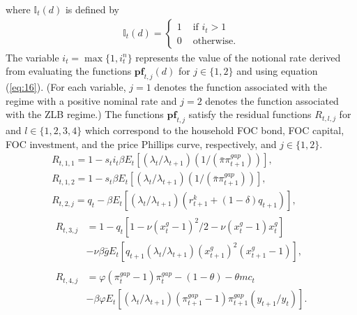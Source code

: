 \documentclass[12pt, final]{article}
\begin{document}
where $\mathds{I}_t(d)$ is defined by
\begin{gather}
    \label{eq:19}
  \mathds{I}_t(d) = 
\begin{cases}
     1 &\text{ if } i_t > 1\\
     0 &\text{ otherwise.}
\end{cases}
\end{gather}
The variable $i_t=\max\{1,i_t^n\}$ represents the value of the notional rate derived from evaluating the functions $\textbf{pf}_{t,j}(d)$ for $j \in \{1,2\}$ and using equation (\ref{eq:16}). (For each variable, $j=1$ denotes the function associated with the regime with a positive nominal rate and $j=2$ denotes the function associated with the ZLB regime.) %
The functions $\textbf{pf}_{t,j}$ satisfy the residual functions $R_{t,l,j}$ for and $l \in \{1,2,3,4\}$ which correspond to the household FOC bond, FOC capital, FOC investment, and the price Phillips curve, respectively, and $j \in \{1,2\}$.
\begin{gather}
\label{eq:20}
  R_{t,1,1} = 1 - s_ti_t\beta E_t[(\lambda_t/\lambda_{t+1})(1/(\bar{\pi}\pi_{t+1}^{gap}))],\\
\label{eq:21}
  R_{t,1,2} = 1 - s_t\beta E_t[(\lambda_t/\lambda_{t+1})(1/(\bar{\pi}\pi_{t+1}^{gap}))],\\
\label{eq:22}
R_{t,2,j} = q_t - \beta E_t[(\lambda_t/\lambda_{t+1})(r^k_{t+1}+(1-\delta)q_{t+1})],\\
 \label{eq:23} 
  \begin{split}
    R_{t,3,j} &= 1 - q_t[1-\nu(x^g_t-1)^2/2 - \nu(x_t^g-1)x_t^g] \\&- \nu\beta\bar{g}E_t[q_{t+1}(\lambda_t/\lambda_{t+1})(x^g_{t+1})^2(x^g_{t+1}-1)], 
  \end{split}
  \\
   \label{eq:24}
  \begin{split}
    R_{t,4,j} &= \varphi(\pi_t^{gap}-1)\pi_t^{gap} - (1-\theta) - \theta mc_t \\&- \beta\varphi E_t[(\lambda_t/\lambda_{t+1})(\pi_{t+1}^{gap}-1)\pi_{t+1}^{gap}(y_{t+1}/y_t)].
    \end{split}
  \end{gather}
\end{document}
